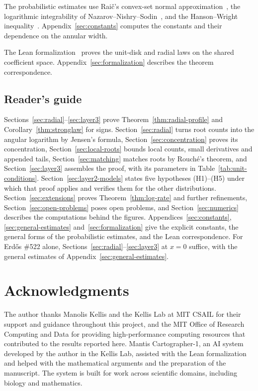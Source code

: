\documentclass[12pt,leqno,twoside]{article}
\theoremstyle{named}
\theoremstyle{remark}
\begin{document}
The probabilistic estimates use Rai\v{c}'s convex-set normal
approximation~\cite{Raic2019}, the logarithmic integrability of
Nazarov--Nishry--Sodin~\cite{NNS2013}, and the Hanson--Wright
inequality~\cite{RudelsonVershynin2013}. Appendix~\ref{sec:constants}
computes the constants and their dependence on the annular width.

The Lean formalization~\cite{FormalCompanion2026} proves the unit-disk
and radial laws on the shared coefficient space.
Appendix~\ref{sec:formalization} describes the theorem correspondence.
\afterpage{}

\subsection*{Reader's guide}
Sections~\ref{sec:radial}--\ref{sec:layer3} prove
Theorem~\ref{thm:radial-profile} and Corollary~\ref{thm:stronglaw} for
signs. Section~\ref{sec:radial} turns root counts into the angular
logarithm by Jensen's formula, Section~\ref{sec:concentration} proves its
concentration, Section~\ref{sec:local-roots} bounds local counts, small
derivatives and appended tails, Section~\ref{sec:matching} matches roots
by Rouch\'e's theorem, and Section~\ref{sec:layer3} assembles the proof,
with its parameters in Table~\ref{tab:unit-conditions}.
Section~\ref{sec:layer2-models} states five hypotheses (H1)--(H5) under
which that proof applies and verifies them for the other distributions.
Section~\ref{sec:extensions} proves Theorem~\ref{thm:log-rate} and further
refinements, Section~\ref{sec:open-problems} poses open problems, and
Section~\ref{sec:numerics} describes the computations behind the figures.
Appendices~\ref{sec:constants}, \ref{sec:general-estimates}
and~\ref{sec:formalization} give the explicit constants, the general
forms of the probabilistic estimates, and the Lean correspondence.
For Erd\H{o}s \#522 alone, Sections~\ref{sec:radial}--\ref{sec:layer3} at
$x=0$ suffice, with the general estimates of
Appendix~\ref{sec:general-estimates}.













\FloatBarrier
\appendix




\section*{Acknowledgments}
The author thanks Manolis Kellis and the Kellis Lab at MIT CSAIL for their support and guidance throughout this project, and the MIT Office of Research Computing and Data for providing high-performance computing resources that contributed to the results reported here. Mantis Cartographer-1, an AI system developed by the author in the Kellis Lab, assisted with the Lean formalization and helped with the mathematical arguments and the preparation of the manuscript. The system is built for work across scientific domains, including biology and mathematics.


\begingroup
\raggedright

\endgroup
\end{document}
